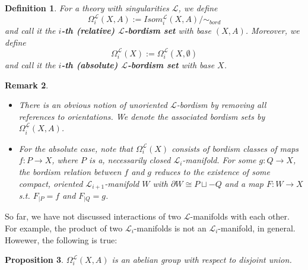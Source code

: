 \documentclass{scrreprt}
\newtheorem{prop}{Proposition}[chapter]
\newtheorem{definition}[prop]{Definition}
\newtheorem{remark}[prop]{Remark}
\begin{document}
\begin{definition}\label{bordismgroup}
For a theory with singularities $\mathcal{L}$, we define  
\begin{equation*}
\Omega_i^\mathcal{L}(X,A):= Isom_i^\mathcal{L}(X,A)/ \sim_{bord}
\end{equation*}
 and call it the \textbf{$i$-th (relative) $\mathcal{L}$-bordism set} with base $(X,A)$. Moreover, we define
\begin{equation*}
\Omega_i^\mathcal{L}(X):=\Omega_i^\mathcal{L}(X, \emptyset)
\end{equation*}
and call it the \textbf{$i$-th (absolute) $\mathcal{L}$-bordism set} with base $X$.
\end{definition}

\begin{remark}
\begin{itemize}
\item[1.] There is an obvious notion of unoriented $\mathcal{L}$-bordism by removing all references to orientations. We denote the associated bordism sets by $\Omega_i^{\underline{\mathcal{L}}}(X,A)$.
\item[2.] For the absolute case, note that $\Omega_i^{\mathcal{L}}(X)$ consists of bordism classes of maps \\ $f: P \to X$, where $P$ is a, necessarily closed $\mathcal{L}_i$-manifold. For some $g: Q \to X$, the bordism relation between $f$ and $g$ reduces to the existence of some compact, oriented $\mathcal{L}_{i+1}$-manifold $W$ with $\partial W \cong P \sqcup -Q$ and a map $F: W \to X$ s.t. $F_{|P}=f$ and $F_{|Q}=g$.
\end{itemize}
\end{remark}

So far, we have not discussed interactions of two $\mathcal{L}$-manifolds with each other. For example, the product of two $\mathcal{L}_i$-manifolds is not an $\mathcal{L}_i$-manifold, in general. Howewer, the following is true:

\begin{prop}
$\Omega_i^{\mathcal{L}}(X,A)$ is an abelian group with respect to disjoint union.
\end{prop}
\end{document}
